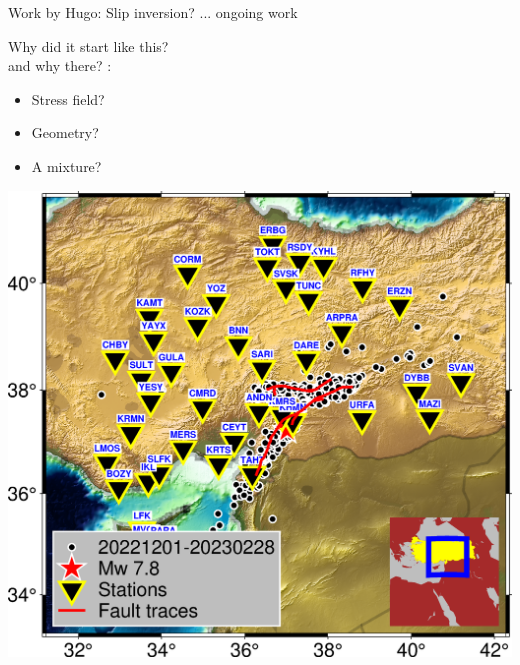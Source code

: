 \documentclass{beamer}
\begin{document}
\begin{frame}
 {Work by Hugo: Slip inversion? ... ongoing work}
 
 \vskip -1cm \begin{minipage}{0.51\linewidth}
  \hskip -2.8cm
\end{minipage} 
\begin{minipage}{0.47\linewidth}
\vskip 1cm Why did it start like this? \\ and why there? :
\vskip 0.1cm
\begin{itemize}
 \item Stress field?
 \item Geometry?
 \item A mixture?
\end{itemize} %
\vskip 0.2cm 
\centering
\includegraphics[width=1\linewidth]{images/Map.png}

\end{minipage} 
 
\end{frame}
\end{document}
